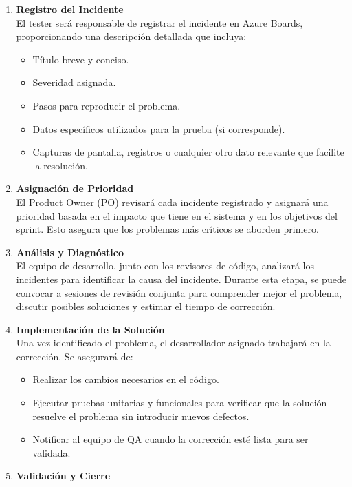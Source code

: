 \begin{enumerate}
    \item \textbf{Registro del Incidente}\\
    El tester será responsable de registrar el incidente en Azure Boards, proporcionando una descripción detallada que incluya:
    \begin{itemize}
        \item Título breve y conciso.
        \item Severidad asignada.
        \item Pasos para reproducir el problema.
        \item Datos específicos utilizados para la prueba (si corresponde).
        \item Capturas de pantalla, registros o cualquier otro dato relevante que facilite la resolución.
    \end{itemize}
    \item \textbf{Asignación de Prioridad}\\
    El Product Owner (PO) revisará cada incidente registrado y asignará una prioridad basada en el impacto que tiene en el sistema y en los objetivos del sprint. 
    Esto asegura que los problemas más críticos se aborden primero.
    \item \textbf{Análisis y Diagnóstico}\\
    El equipo de desarrollo, junto con los revisores de código, analizará los incidentes para identificar la causa del incidente. Durante esta etapa, se puede convocar 
    a sesiones de revisión conjunta para comprender mejor el problema, discutir posibles soluciones y estimar el tiempo de corrección.
    \item \textbf{Implementación de la Solución}\\
    Una vez identificado el problema, el desarrollador asignado trabajará en la corrección. Se asegurará de:
    \begin{itemize}
        \item Realizar los cambios necesarios en el código.
        \item Ejecutar pruebas unitarias y funcionales para verificar que la solución resuelve el problema sin introducir nuevos defectos.
        \item Notificar al equipo de QA cuando la corrección esté lista para ser validada.
    \end{itemize}
    \item \textbf{Validación y Cierre}\\

\end{enumerate}
